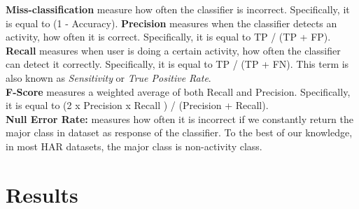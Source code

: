 \documentclass[journal,article,submit,moreauthors,pdftex]{Definitions/mdpi}
\begin{document}
\noindent \textbf{Miss-classification} measure how often the classifier is incorrect. Specifically, it is equal to (1 - Accuracy).
\noindent \textbf{Precision} measures when the classifier detects an activity, how often it is  correct. Specifically, it is equal to TP / (TP + FP). \\
\noindent \textbf{Recall} measures when user is doing a certain activity, how often the classifier can detect it correctly. Specifically, it is equal to TP / (TP + FN). This term is also known as \textit{Sensitivity} or \textit{True Positive Rate}.\\
\noindent \textbf{F-Score} measures a weighted average of both Recall and Precision. Specifically, it is equal to (2 x Precision x Recall ) / (Precision + Recall). \\
\noindent \textbf{Null Error Rate:} measures how often it is incorrect if we constantly return the major class in dataset as response of the classifier. To the best of our knowledge, in most HAR datasets, the major class is non-activity class.\\

\section{Results}
\end{document}
